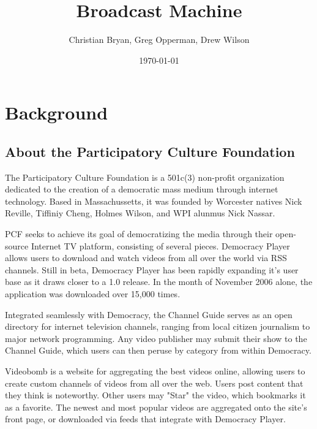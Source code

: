 \documentclass[a4paper,12pt]{report}
\author{Christian Bryan, Greg Opperman, Drew Wilson}
\date{\today}
\title{Broadcast Machine}
\begin{document}
\maketitle

\tableofcontents

\chapter{Background}

\begin{comment}
* Importance of open media and an open internet for open media.
	* A brief history of the software and PCF.
	* How Broadcast Machine relates to similar software such as:
		> WordPress
		> Drupal
		> YouTube
	* Why Broadcast Machine will be built in PHP/MySQL versus Ruby on Rails, J2EE, and other PHP frameworks.
\end{comment}
\section{About the Participatory Culture Foundation}
	The Participatory Culture Foundation is a 501c(3) non-profit organization dedicated to the creation of a democratic mass medium through internet technology. 
Based in Massachussetts, it was founded by Worcester natives Nick Reville, Tiffiniy Cheng, Holmes Wilson, and WPI alunmus Nick Nassar.

	PCF seeks to achieve its goal of democratizing the media through their open-source Internet TV platform, consisting of several pieces.  Democracy Player allows users to download and watch videos from all over the world via RSS channels. 
Still in beta, Democracy Player has been rapidly expanding it's user base as it draws closer to a 1.0 release. 
In the month of November 2006 alone, the application was downloaded over 15,000 times.

Integrated seamlessly with Democracy, the Channel Guide serves as an open directory for internet television channels, ranging from local citizen journalism to major network programming. 
Any video publisher may submit their show to the Channel Guide, which users can then peruse by category from within Democracy.

Videobomb is a website for aggregating the best videos online, allowing users to create custom channels of videos from all over the web. 
Users post content that they think is noteworthy. 
Other users may "Star" the video, which bookmarks it as a favorite. 
The newest and most popular videos are aggregated onto the site's front page, or downloaded via feeds that integrate with Democracy Player.
\end{document}
